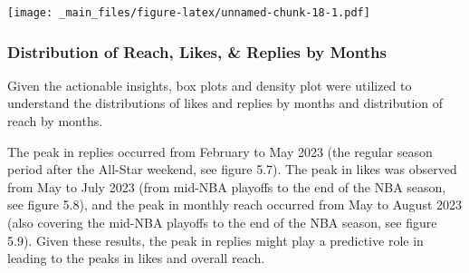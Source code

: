 \documentclass[
]{book}
\begin{document}
\texttt{[image: \_main\_files/figure-latex/unnamed-chunk-18-1.pdf]}

\hypertarget{distribution-of-reach-likes-replies-by-months}{%
\subsubsection{Distribution of Reach, Likes, \& Replies by Months}\label{distribution-of-reach-likes-replies-by-months}}

Given the actionable insights, box plots and density plot were utilized to understand the distributions of likes and replies by months and distribution of reach by months.

The peak in replies occurred from February to May 2023 (the regular season period after the All-Star weekend, see figure 5.7). The peak in likes was observed from May to July 2023 (from mid-NBA playoffs to the end of the NBA season, see figure 5.8), and the peak in monthly reach occurred from May to August 2023 (also covering the mid-NBA playoffs to the end of the NBA season, see figure 5.9). Given these results, the peak in replies might play a predictive role in leading to the peaks in likes and overall reach.
\end{document}

